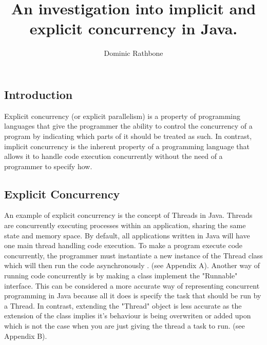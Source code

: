 \documentclass[]{report}
\title{An investigation into implicit and explicit concurrency in Java.}
\author{Dominic Rathbone}
\begin{document}
\maketitle

\subsection{Introduction}
Explicit concurrency (or explicit parallelism) is a property of programming languages that give the programmer the ability to control the concurrency of a program by indicating which parts of it should be treated as such. In contrast, implicit concurrency is the inherent property of a programming language that allows it to handle code execution concurrently without the need of a programmer to specify how.

\subsection{Explicit Concurrency}
An example of explicit concurrency is the concept of Threads in Java. Threads are concurrently executing processes within an application, sharing the same state and memory space. By default, all applications written in Java will have one main thread handling code execution. To make a program execute code concurrently, the programmer must instantiate a new instance of the Thread class which will then run the code asynchronously \cite{Threading}. (see Appendix A). Another way of running code concurrently is by making a class implement the "Runnable" interface.\cite{Threading} This can be considered a more accurate way of representing concurrent programming in Java because all it does is specify the task that should be run by a Thread. In contrast, extending the "Thread" object is less accurate as the extension of the class implies it's behaviour is being overwriten or added upon which is not the case when you are just giving the thread a task to run. (see Appendix B).
\end{document}
